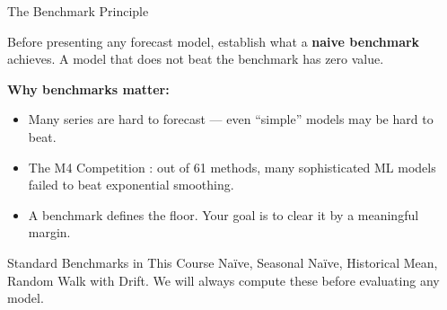 \documentclass[aspectratio=169, 11pt]{beamer}
\begin{document}

\begin{frame}{The Benchmark Principle}
  \begin{keybox}
    Before presenting any forecast model, establish what a \textbf{naive benchmark}
    achieves. A model that does not beat the benchmark has zero value.
  \end{keybox}
  \vspace{0.3cm}
  \textbf{Why benchmarks matter:}
  \begin{itemize}
    \item Many series are hard to forecast --- even ``simple'' models may be hard to beat.
    \item The M4 Competition \parencite{Makridakis2020}: out of 61 methods, many sophisticated
          ML models failed to beat exponential smoothing.
    \item A benchmark defines the floor.
          Your goal is to clear it by a meaningful margin.
  \end{itemize}
  \vspace{0.2cm}
  \begin{examplebox}{Standard Benchmarks in This Course}
    Na\"{i}ve, Seasonal Na\"{i}ve, Historical Mean, Random Walk with Drift.
    We will always compute these before evaluating any model.
  \end{examplebox}
\end{frame}
\end{document}
